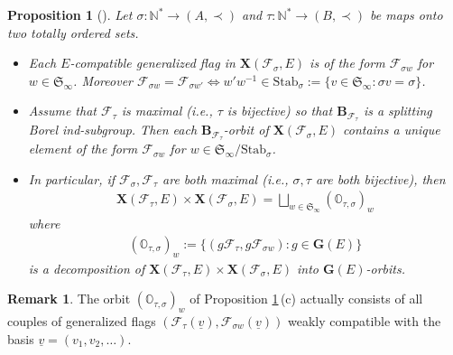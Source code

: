 \documentclass{amsart}
\newtheorem{proposition}{Proposition}
\theoremstyle{definition}
\newtheorem{remark}{Remark}
\newcommand{\NN}{\mathbb{N}^*}
\begin{document}



\begin{proposition}[\cite{Fresse-Penkov}]
\label{P2-3.2}
Let $\sigma:\NN\to (A,\prec)$ and $\tau:\NN\to (B,\prec)$ be maps onto two totally ordered sets.
\begin{itemize}
\item[\rm (a)] Each $E$-compatible generalized flag in $\mathbf{X}(\mathcal{F}_\sigma,E)$ is of the form $\mathcal{F}_{\sigma w}$ for $w\in \mathfrak{S}_\infty$.
Moreover $\mathcal{F}_{\sigma w}=\mathcal{F}_{\sigma w'}\Leftrightarrow
w'w^{-1}\in\mathrm{Stab}_\sigma:=\{v\in\mathfrak{S}_\infty:\sigma v=\sigma\}$.
\item[\rm (b)] Assume that $\mathcal{F}_\tau$ is maximal (i.e., $\tau$ is bijective)
so that $\mathbf{B}_{\mathcal{F}_\tau}$ is a splitting Borel ind-subgroup.
Then each $\mathbf{B}_{\mathcal{F}_\tau}$-orbit of $\mathbf{X}(\mathcal{F}_\sigma,E)$ 
contains a unique element of the form $\mathcal{F}_{\sigma w}$ for $w\in\mathfrak{S}_\infty/\mathrm{Stab}_\sigma$.
\item[\rm (c)] In particular, if $\mathcal{F}_\sigma,\mathcal{F}_\tau$ are both maximal (i.e., $\sigma,\tau$ are both bijective), then
\begin{eqnarray*}
\displaystyle \mathbf{X}(\mathcal{F}_\tau,E)\times\mathbf{X}(\mathcal{F}_\sigma,E)=\bigsqcup_{w\in\mathfrak{S}_\infty}(\pmb{\mathbb{O}}_{\tau,\sigma})_w 
\end{eqnarray*}
where
\begin{eqnarray*}
(\pmb{\mathbb{O}}_{\tau,\sigma})_w:=\{(g\mathcal{F}_\tau,g\mathcal{F}_{\sigma w}):g\in\mathbf{G}(E)\}
\end{eqnarray*}
is a decomposition of $\mathbf{X}(\mathcal{F}_\tau,E)\times\mathbf{X}(\mathcal{F}_\sigma,E)$ into $\mathbf{G}(E)$-orbits.
\end{itemize}
\end{proposition}

\begin{remark}
The orbit $(\pmb{\mathbb{O}}_{\tau,\sigma})_w$ 
of Proposition \ref{P2-3.2}\,{\rm (c)}
actually consists of all couples of generalized flags $(\mathcal{F}_\tau(\underline{v}),\mathcal{F}_{\sigma w}(\underline{v}))$
weakly compatible with the basis $\underline{v}=(v_1,v_2,\ldots)$.
\end{remark}
\end{document}
